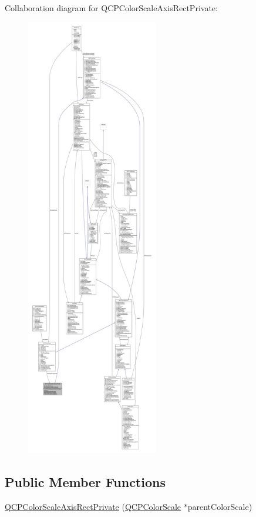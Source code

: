 Collaboration diagram for Q\+C\+P\+Color\+Scale\+Axis\+Rect\+Private\+:\nopagebreak
\begin{figure}[H]
\begin{center}
\leavevmode
\includegraphics[height=550pt]{class_q_c_p_color_scale_axis_rect_private__coll__graph}
\end{center}
\end{figure}
\subsection*{Public Member Functions}
\begin{DoxyCompactItemize}
\item 
\hyperlink{class_q_c_p_color_scale_axis_rect_private_ad3b242f75dd2b33581364a4e668a80db}{Q\+C\+P\+Color\+Scale\+Axis\+Rect\+Private} (\hyperlink{class_q_c_p_color_scale}{Q\+C\+P\+Color\+Scale} $\ast$parent\+Color\+Scale)
\end{DoxyCompactItemize}
